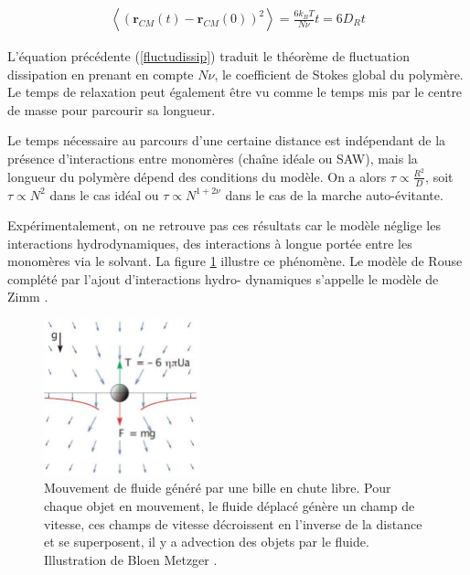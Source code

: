 \begin{eqnarray}
\left<(\textbf{r}_{CM}(t)-\textbf{r}_{CM}(0))^2\right>=\frac{6 k_B T}{N \nu} t = 6 D_R t
\label{fluctudissip}
\end{eqnarray}




L'équation précédente (\ref{fluctudissip}) traduit le théorème de fluctuation dissipation  en prenant en compte $N \nu$, le coefficient de Stokes global du polymère. Le temps de relaxation peut également être vu comme le temps mis par le centre de masse pour parcourir sa longueur.

 Le temps nécessaire au parcours d'une certaine distance est indépendant de la présence d'interactions entre monomères (chaîne idéale ou SAW), mais la longueur du polymère dépend des conditions du modèle. On a alors $\tau \propto \frac{R^2}{D}$, soit $\tau \propto N^2 $ dans le cas idéal ou $\tau \propto N^{1+2\nu} $ dans le cas de la marche auto-évitante. 

Expérimentalement, on ne retrouve pas ces résultats car le modèle néglige les interactions hydrodynamiques, des interactions à longue portée entre les monomères via le solvant. La figure \ref{hydrodyninterac} illustre ce phénomène. Le modèle de Rouse complété par l'ajout d'interactions hydro- dynamiques s’appelle le modèle de Zimm \cite{Zimm1956}.


\begin{figure}[H]
\begin{center}
\includegraphics[width=0.4\textwidth]{hydrodyninterac.jpg} 

\caption[Interactions hydrodynamiques]{Mouvement de fluide généré par une bille en chute libre. Pour chaque objet en mouvement, le fluide déplacé génère un champ de vitesse, ces champs de vitesse décroissent en l'inverse de la distance et se superposent, il y a advection des objets par le fluide. Illustration de Bloen Metzger \cite{bloen}.}
\label{hydrodyninterac}
\end{center}
\end{figure}

